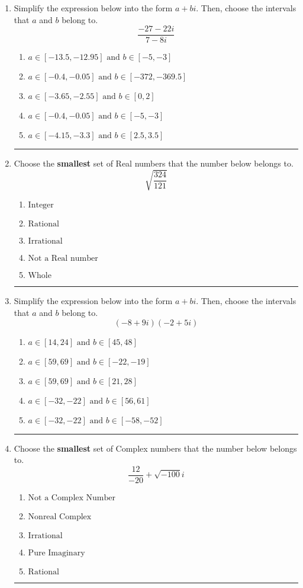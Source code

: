 \documentclass[14pt]{extbook}
\newcommand{\litem}[1]{\item#1\hspace*{-1cm}\rule{\textwidth}{0.4pt}}
\begin{document}
\begin{enumerate}
\litem{
Simplify the expression below into the form $a+bi$. Then, choose the intervals that $a$ and $b$ belong to.\[ \frac{-27 - 22 i}{7 - 8 i} \]\begin{enumerate}[label=\Alph*.]
\item \( a \in [-13.5, -12.95] \text{ and } b \in [-5, -3] \)
\item \( a \in [-0.4, -0.05] \text{ and } b \in [-372, -369.5] \)
\item \( a \in [-3.65, -2.55] \text{ and } b \in [0, 2] \)
\item \( a \in [-0.4, -0.05] \text{ and } b \in [-5, -3] \)
\item \( a \in [-4.15, -3.3] \text{ and } b \in [2.5, 3.5] \)

\end{enumerate} }
\litem{
Choose the \textbf{smallest} set of Real numbers that the number below belongs to.\[ \sqrt{\frac{324}{121}} \]\begin{enumerate}[label=\Alph*.]
\item \( \text{Integer} \)
\item \( \text{Rational} \)
\item \( \text{Irrational} \)
\item \( \text{Not a Real number} \)
\item \( \text{Whole} \)

\end{enumerate} }
\litem{
Simplify the expression below into the form $a+bi$. Then, choose the intervals that $a$ and $b$ belong to.\[ (-8 + 9 i)(-2 + 5 i) \]\begin{enumerate}[label=\Alph*.]
\item \( a \in [14, 24] \text{ and } b \in [45, 48] \)
\item \( a \in [59, 69] \text{ and } b \in [-22, -19] \)
\item \( a \in [59, 69] \text{ and } b \in [21, 28] \)
\item \( a \in [-32, -22] \text{ and } b \in [56, 61] \)
\item \( a \in [-32, -22] \text{ and } b \in [-58, -52] \)

\end{enumerate} }
\litem{
Choose the \textbf{smallest} set of Complex numbers that the number below belongs to.\[ \frac{12}{-20}+\sqrt{-100}i \]\begin{enumerate}[label=\Alph*.]
\item \( \text{Not a Complex Number} \)
\item \( \text{Nonreal Complex} \)
\item \( \text{Irrational} \)
\item \( \text{Pure Imaginary} \)
\item \( \text{Rational} \)


\end{enumerate}}
\end{enumerate}
\end{document}
